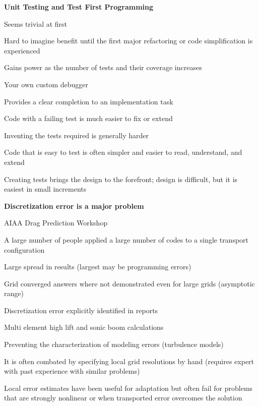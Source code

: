 \documentclass[landscape]{slides}
\renewcommand{\title}[1]{{\large\bfseries #1}}
\newenvironment{itemiz}%
  {\begin{list}{}{\raggedright
      \setlength{\itemsep}{2pt}%
      \setlength{\parskip}{4pt}\setlength{\parsep}{2pt}}}%
  {\end{list}}%
\begin{document}
 \begin{slide}
   \title{ Unit Testing and Test First Programming}
   \begin{itemiz}
   \item Seems trivial at first
   \item Hard to imagine benefit until the first major refactoring or
     code simplification is experienced
   \item Gains power as the number of tests and their coverage increases
   \item Your own custom debugger
   \item Provides a clear completion to an implementation task
   \item Code with a failing test is much easier to fix or extend
   \item Inventing the tests required is generally harder
   \item Code that is easy to test is often simpler and easier to
   read, understand, and extend
   \item Creating tests brings the design to the forefront; design is
   difficult, but it is easiest in small increments
   \end{itemiz}
 \end{slide}
   
 \begin{slide}
   \title{ Discretization error is a major problem }
   \begin{itemiz}
   \item AIAA Drag Prediction Workshop
     \begin{itemiz}
     \item A large number of people applied a large number of codes to
     a single transport configuration
     \item Large spread in results (largest may be programming errors)
     \item Grid converged answers where not demonstrated even for large
       grids (asymptotic range)
     \item Discretization error explicitly identified in reports 
     \end{itemiz}
   \item Multi element high lift and sonic boom calculations
   \item Preventing the characterization of modeling errors (turbulence models)
   \item It is often combated by specifying local grid resolutions by
   hand (requires expert with past experience with similar problems)
   \item Local error estimates have been useful for adaptation but
     often fail for problems that are strongly nonlinear or when
     transported error overcomes the solution
   \end{itemiz}
 \end{slide}
   
\end{document}
